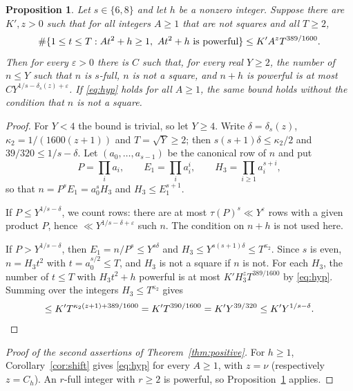 \documentclass[11pt,reqno]{amsart}
\newtheorem{proposition}[theorem]{Proposition}
\theoremstyle{definition}
\theoremstyle{remark}
\numberwithin{equation}{section}
\newcommand{\eps}{\varepsilon}\newcommand{\card}{\#}
\begin{document}
\begin{proposition}\label{prop:uniform-mixed}
Let $s\in\{6,8\}$ and let $h$ be a nonzero integer. Suppose there are
$K',z>0$ such that for all integers $A\ge1$ that are not squares and all
$T\ge2$,
\begin{equation}\label{eq:hyp}
 \card\{1\le t\le T:At^2+h\ge1,\ At^2+h\textnormal{ is powerful}\}\le K'A^{z}T^{389/1600}.
\end{equation}
Then for every $\eps>0$ there is $C$ such that, for every real $Y\ge2$,
the number of $n\le Y$ such that $n$ is $s$-full,
$n$ is not a square, and $n+h$ is powerful is
at most $CY^{1/s-\delta_s(z)+\eps}$. If \eqref{eq:hyp} holds for all $A\ge1$, the
same bound holds without the condition that $n$ is not a square.
\end{proposition}
\begin{proof}
For $Y<4$ the bound is trivial, so let $Y\ge4$. Write
$\delta=\delta_s(z)$, $\kappa_2=1/(1600(z+1))$ and $T=\sqrt Y\ge2$; then
$s(s+1)\delta\le\kappa_2/2$ and $39/320\le1/s-\delta$. Let
$(a_0,\dots,a_{s-1})$ be the canonical row of $n$ and put
\[
 P=\prod_ia_i,\qquad E_1=\prod_ia_i^{i},\qquad H_3=\prod_{i\ge1}a_i^{s+i},
\]
so that $n=P^{s}E_1=a_0^{s}H_3$ and $H_3\le E_1^{s+1}$.

If $P\le Y^{1/s-\delta}$, we count rows: there are at most
$\tau(P)^{s}\ll Y^{\eps}$ rows with a given product $P$, hence
$\ll Y^{1/s-\delta+\eps}$ such $n$. The condition on $n+h$ is not used here.

If $P>Y^{1/s-\delta}$, then $E_1=n/P^{s}\le Y^{s\delta}$ and
$H_3\le Y^{s(s+1)\delta}\le T^{\kappa_2}$. Since $s$ is even,
$n=H_3t^2$ with $t=a_0^{s/2}\le T$, and $H_3$ is not a square if $n$ is not.
For each $H_3$, the number of $t\le T$ with $H_3t^2+h$ powerful is at most
$K'H_3^{z}T^{389/1600}$ by \eqref{eq:hyp}. Summing over the integers
$H_3\le T^{\kappa_2}$ gives
\[
 \le K'T^{\kappa_2(z+1)+389/1600}=K'T^{390/1600}=K'Y^{39/320}
 \le K'Y^{1/s-\delta}. \qedhere
\]
\end{proof}

\begin{proof}[Proof of the second assertions of Theorem~\ref{thm:positive}]
For $h\ge1$, Corollary~\ref{cor:shift} gives \eqref{eq:hyp} for every
$A\ge1$, with $z=\nu$ (respectively $z=C_h$). An $r$-full integer with
$r\ge2$ is powerful, so Proposition~\ref{prop:uniform-mixed} applies.
\end{proof}
\end{document}
